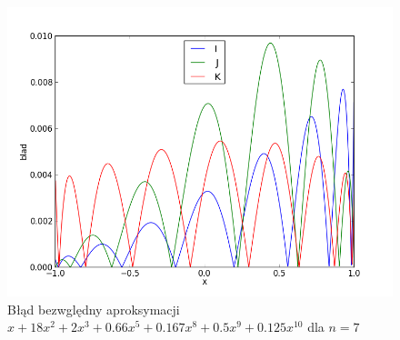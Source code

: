 \documentclass[11pt,leqno]{article}
\begin{document}
\begin{center}
    \begin{figure}[!ht]
        \begin{center}
        \includegraphics{graph2_7.png}
        \caption{Błąd bezwględny aproksymacji $x + 18x^2 + 2x^3 + 0.66x^5 + 0.167x^8 + 0.5x^9 + 0.125x^{10}$ dla $n=7$}\label{G:Wykrespoly7}
    \end{center}
    \end{figure}
\end{center}
\end{document}
